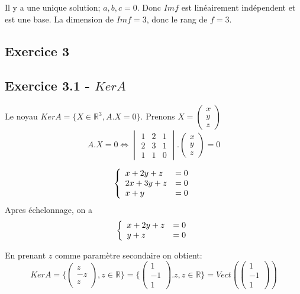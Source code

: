 \documentclass[]{book}
\theoremstyle{definition}
\newcommand{\bb}[1]{\mathbb{#1}}
\newcommand{\R}{\bb{R}}
\begin{document}
Il y a une unique solution; $a,b,c = 0$. Donc $Im f$ est lin\'eairement ind\'ependent et est une base.
La dimension de $Im f = 3$, donc le rang de $f = 3$.

\subsection*{Exercice 3}
\subsection*{Exercice 3.1 - $Ker A$}

Le noyau $Ker A = \{X \in \R^3, A.X = 0\}$. Prenons $X = \begin{pmatrix} x \\ y \\ z \end{pmatrix}$
$$A.X = 0 \Leftrightarrow \begin{vmatrix} 1 & 2 & 1 \\ 2 & 3 & 1 \\ 1 & 1 & 0 \end{vmatrix} . \begin{pmatrix} x \\ y \\ z \end{pmatrix} = 0$$

$$ 
\left\{ 
\begin{array}{l l}
x + 2y + z & = 0\\
2x + 3y + z & = 0\\
x + y  & = 0\\
\end{array}
\right. 
$$ 
Apres \'echelonnage, on a 
$$ 
\left\{ 
\begin{array}{l l}
x + 2y + z & = 0\\
y + z & = 0\\
\end{array}
\right. 
$$ 

En prenant $z$ comme param\`etre secondaire on obtient:
$$Ker A = \{ \begin{pmatrix} z \\ -z \\ z \end{pmatrix}, z \in \R\} = \{ \begin{pmatrix} 1 \\ -1 \\ 1 \end{pmatrix}.z, z \in \R\} = Vect(\begin{pmatrix} 1 \\ -1 \\ 1 \end{pmatrix})$$
\end{document}
